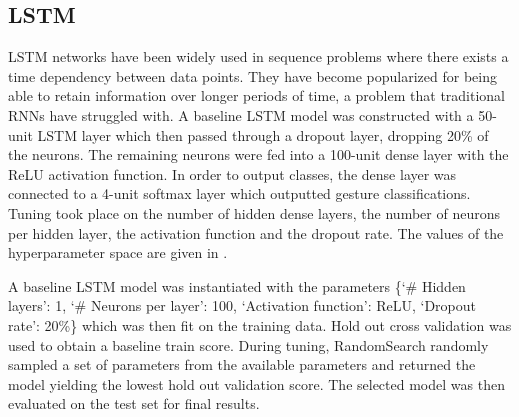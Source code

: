 \documentclass[journal]{IEEEtran}
\begin{document}
\subsection{LSTM}
LSTM networks have been widely used in sequence problems where there exists a time dependency between data points. They have become popularized for being able to retain information over longer periods of time, a problem that traditional RNNs have struggled with. A baseline LSTM model was constructed with a 50-unit LSTM layer which then passed through a dropout layer, dropping 20\% of the neurons. The remaining neurons were fed into a 100-unit dense layer with the ReLU activation function. In order to output classes, the dense layer was connected to a 4-unit softmax layer which outputted gesture classifications. Tuning took place on the number of hidden dense layers, the number of neurons per hidden layer, the activation function and the dropout rate. The values of the hyperparameter space are given in .

\begingroup
\def\arraystretch{1.2}%
\setlength{\tabcolsep}{2pt} %
\begin{table}[b]
	\centering
	\caption{LSTM Hyperparameter Tuning Space.}
	\label{table:lstm_param}
\end{table}%
\endgroup

A baseline LSTM model was instantiated with the parameters \{‘\# Hidden layers’: 1,  ‘\# Neurons per layer’: 100, ‘Activation function’: ReLU, ‘Dropout rate’: 20\%\} which was then fit on the training data. Hold out cross validation was used to obtain a baseline train score. During tuning, RandomSearch randomly sampled a set of parameters from the available parameters and returned the model yielding the lowest hold out validation score. The selected model was then evaluated on the test set for final results.
\end{document}
